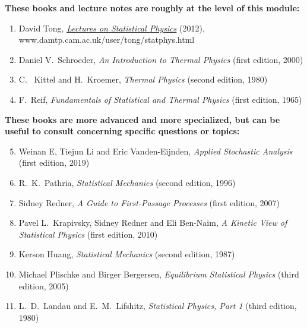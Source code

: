 \documentclass[12 pt]{article}
\begin{document}
\noindent\textbf{These books and lecture notes are roughly at the level of this module:} \\[-24 pt]
\begin{enumerate}
  \item David Tong, \href{https://www.damtp.cam.ac.uk/user/tong/statphys.html}{\textit{Lectures on Statistical Physics}} (2012), \\ www.damtp.cam.ac.uk/user/tong/statphys.html
  \item Daniel V.~Schroeder, \textit{An Introduction to Thermal Physics} (first edition, 2000)
  \item C.~ Kittel and H.~Kroemer, \textit{Thermal Physics} (second edition, 1980)
  \item F.~Reif, \textit{Fundamentals of Statistical and Thermal Physics} (first edition, 1965)
\end{enumerate}

\noindent\textbf{These books are more advanced and more specialized, but can be useful to consult concerning specific questions or topics:} \\[-24 pt]
\begin{enumerate}
  \setcounter{enumi}{4}
  \item Weinan E, Tiejun Li and Eric Vanden-Eijnden, \textit{Applied Stochastic Analysis} (first edition, 2019)
  \item R.~K.~Pathria, \textit{Statistical Mechanics} (second edition, 1996)
  \item Sidney Redner, \textit{A Guide to First-Passage Processes} (first edition, 2007)
  \item Pavel L.~Krapivsky, Sidney Redner and Eli Ben-Naim, \textit{A Kinetic View of Statistical Physics} (first edition, 2010)
  \item Kerson Huang, \textit{Statistical Mechanics} (second edition, 1987)
  \item Michael Plischke and Birger Bergersen, \textit{Equilibrium Statistical Physics} (third edition, 2005)
  \item L.~D.~Landau and E.~M.~Lifshitz, \textit{Statistical Physics, Part 1} (third edition, 1980)
\end{enumerate}
\end{document}
